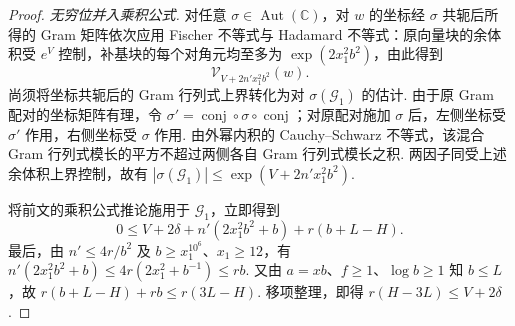 \begin{proof}
\emph{无穷位并入乘积公式.}
对任意 $\sigma\in\operatorname{Aut}(\mathbb C)$，对 $w$ 的坐标经 $\sigma$ 共轭后所得的 Gram 矩阵依次应用 Fischer 不等式与 Hadamard 不等式：原向量块的余体积受 $e^V$ 控制，补基块的每个对角元均至多为 $\exp(2x_1^2b^2)$，由此得到
\[
 \mathcal V_{V+2n'x_1^2b^2}(w).
\]
尚须将坐标共轭后的 Gram 行列式上界转化为对 $\sigma(\mathcal G_1)$ 的估计. 由于原 Gram 配对的坐标矩阵有理，令 $\sigma'=\operatorname{conj}\circ\sigma\circ\operatorname{conj}$；对原配对施加 $\sigma$ 后，左侧坐标受 $\sigma'$ 作用，右侧坐标受 $\sigma$ 作用. 由外幂内积的 Cauchy--Schwarz 不等式，该混合 Gram 行列式模长的平方不超过两侧各自 Gram 行列式模长之积. 两因子同受上述余体积上界控制，故有 $|\sigma(\mathcal G_1)|\le\exp(V+2n'x_1^2b^2)$.

将前文的乘积公式推论施用于 $\mathcal G_1$，立即得到
\[
 0\le V+2\delta+n'(2x_1^2b^2+b)+r(b+L-H).
\]
最后，由 $n'\le 4r/b^2$ 及 $b\ge x_1^{10^6}$、$x_1\ge 12$，有 $n'(2x_1^2b^2+b)\le 4r(2x_1^2+b^{-1})\le rb$. 又由 $a=xb$、$f\ge1$、$\log b\ge1$ 知 $b\le L$，故 $r(b+L-H)+rb\le r(3L-H)$. 移项整理，即得 $r(H-3L)\le V+2\delta$.
\end{proof}
